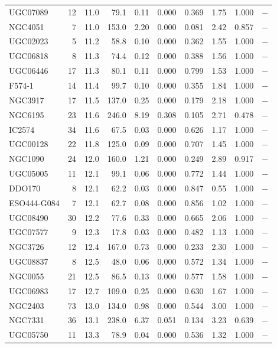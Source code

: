 \begin{longtable}{lrrrrrrrrr}
UGC07089 & 12 & 11.0 & 79.1 & 0.11 & 0.000 & 0.369 & 1.75 & 1.000 & $-$ \\
NGC4051 & 7 & 11.0 & 153.0 & 2.20 & 0.000 & 0.081 & 2.42 & 0.857 & $-$ \\
UGC02023 & 5 & 11.2 & 58.8 & 0.10 & 0.000 & 0.362 & 1.55 & 1.000 & $-$ \\
UGC06818 & 8 & 11.3 & 74.4 & 0.12 & 0.000 & 0.388 & 1.56 & 1.000 & $-$ \\
UGC06446 & 17 & 11.3 & 80.1 & 0.11 & 0.000 & 0.799 & 1.53 & 1.000 & $-$ \\
F574-1 & 14 & 11.4 & 99.7 & 0.10 & 0.000 & 0.355 & 1.84 & 1.000 & $-$ \\
NGC3917 & 17 & 11.5 & 137.0 & 0.25 & 0.000 & 0.179 & 2.18 & 1.000 & $-$ \\
NGC6195 & 23 & 11.6 & 246.0 & 8.19 & 0.308 & 0.105 & 2.71 & 0.478 & $-$ \\
IC2574 & 34 & 11.6 & 67.5 & 0.03 & 0.000 & 0.626 & 1.17 & 1.000 & $-$ \\
UGC00128 & 22 & 11.8 & 125.0 & 0.09 & 0.000 & 0.707 & 1.45 & 1.000 & $-$ \\
NGC1090 & 24 & 12.0 & 160.0 & 1.21 & 0.000 & 0.249 & 2.89 & 0.917 & $-$ \\
UGC05005 & 11 & 12.1 & 99.1 & 0.06 & 0.000 & 0.772 & 1.44 & 1.000 & $-$ \\
DDO170 & 8 & 12.1 & 62.2 & 0.03 & 0.000 & 0.847 & 0.55 & 1.000 & $-$ \\
ESO444-G084 & 7 & 12.1 & 62.7 & 0.08 & 0.000 & 0.856 & 1.02 & 1.000 & $-$ \\
UGC08490 & 30 & 12.2 & 77.6 & 0.33 & 0.000 & 0.665 & 2.06 & 1.000 & $-$ \\
UGC07577 & 9 & 12.3 & 17.8 & 0.03 & 0.000 & 0.482 & 1.13 & 1.000 & $-$ \\
NGC3726 & 12 & 12.4 & 167.0 & 0.73 & 0.000 & 0.233 & 2.30 & 1.000 & $-$ \\
UGC08837 & 8 & 12.5 & 48.0 & 0.06 & 0.000 & 0.572 & 1.34 & 1.000 & $-$ \\
NGC0055 & 21 & 12.5 & 86.5 & 0.13 & 0.000 & 0.577 & 1.58 & 1.000 & $-$ \\
UGC06983 & 17 & 12.7 & 109.0 & 0.25 & 0.000 & 0.630 & 1.67 & 1.000 & $-$ \\
NGC2403 & 73 & 13.0 & 134.0 & 0.98 & 0.000 & 0.544 & 3.00 & 1.000 & $-$ \\
NGC7331 & 36 & 13.1 & 238.0 & 6.37 & 0.051 & 0.134 & 3.23 & 0.639 & $-$ \\
UGC05750 & 11 & 13.3 & 78.9 & 0.04 & 0.000 & 0.536 & 1.32 & 1.000 & $-$ \\

\end{longtable}
